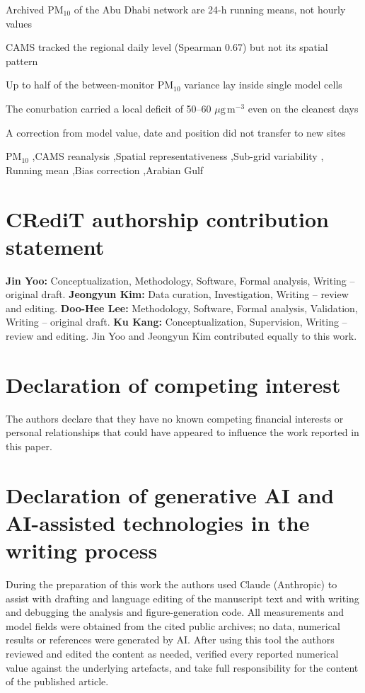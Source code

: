 \documentclass[preprint,review,12pt,number,sort&compress]{elsarticle}
\newcommand*{\ugm}{\ensuremath{\mu\mathrm{g\,m^{-3}}}}
\begin{document}
\begin{frontmatter}
\begin{highlights}
\item Archived PM$_{10}$ of the Abu Dhabi network are 24-h running means, not hourly values
\item CAMS tracked the regional daily level (Spearman 0.67) but not its spatial pattern
\item Up to half of the between-monitor PM$_{10}$ variance lay inside single model cells
\item The conurbation carried a local deficit of 50--60 \ugm{} even on the cleanest days
\item A correction from model value, date and position did not transfer to new sites
\end{highlights}

\begin{keyword}
PM$_{10}$ \sep CAMS reanalysis \sep Spatial representativeness \sep Sub-grid variability \sep
Running mean \sep Bias correction \sep Arabian Gulf
\end{keyword}

\end{frontmatter}

\linenumbers



\section*{CRediT authorship contribution statement}
\textbf{Jin Yoo:} Conceptualization, Methodology, Software, Formal analysis, Writing -- original
draft. \textbf{Jeongyun Kim:} Data curation, Investigation, Writing -- review and editing.
\textbf{Doo-Hee Lee:} Methodology, Software, Formal analysis, Validation, Writing -- original
draft. \textbf{Ku Kang:} Conceptualization, Supervision, Writing -- review
and editing. Jin Yoo and Jeongyun Kim contributed equally to this work.

\section*{Declaration of competing interest}
The authors declare that they have no known competing financial interests or personal
relationships that could have appeared to influence the work reported in this paper.

\section*{Declaration of generative AI and AI-assisted technologies in the writing process}
During the preparation of this work the authors used Claude (Anthropic) to assist with drafting
and language editing of the manuscript text and with writing and debugging the analysis and
figure-generation code. All measurements and model fields were obtained from the cited public
archives; no data, numerical results or references were generated by AI. After using this tool
the authors reviewed and edited the content as needed, verified every reported numerical value
against the underlying artefacts, and take full responsibility for the content of the published
article.
\end{document}
